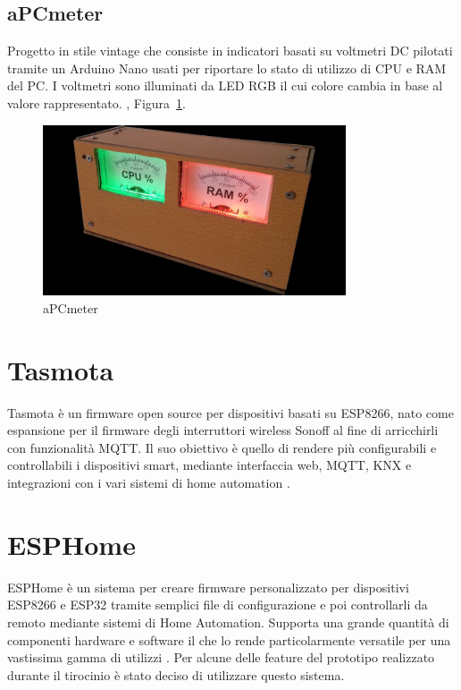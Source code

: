 \documentclass[12pt,a4paper]{report}
\begin{document}
\subsection{aPCmeter}
Progetto in stile vintage che consiste in indicatori basati su voltmetri DC pilotati tramite un Arduino Nano usati per riportare lo stato di
utilizzo di CPU e RAM del PC. I voltmetri sono illuminati da LED RGB il cui colore cambia in base al valore rappresentato.
\cite{apcmeter}, Figura~\ref{fig:apcmeter}.

\begin{figure}[h]
  \centering
  \includegraphics[width=0.8\textwidth]{apcmeter}
  \caption{aPCmeter \cite{apcmeter}}
  \label{fig:apcmeter}
\end{figure}


\section{Tasmota}
Tasmota è un firmware open source per dispositivi basati su ESP8266, nato come espansione per il firmware degli interruttori
wireless Sonoff al fine di arricchirli con funzionalità MQTT. Il suo obiettivo è quello di rendere più configurabili e controllabili i dispositivi
smart, mediante interfaccia web, MQTT, KNX e integrazioni con i vari sistemi di home automation 
\cite{abouttasmota}.

\section{ESPHome}
ESPHome è un sistema per creare firmware personalizzato per dispositivi ESP8266 e ESP32 tramite semplici file di configurazione e poi controllarli
da remoto mediante sistemi di Home Automation.
Supporta una grande quantità di componenti hardware e software il che lo rende particolarmente versatile per una vastissima gamma di utilizzi
\cite{esphomeio}.
Per alcune delle feature del prototipo realizzato durante il tirocinio è stato deciso di utilizzare questo sistema.
\end{document}
